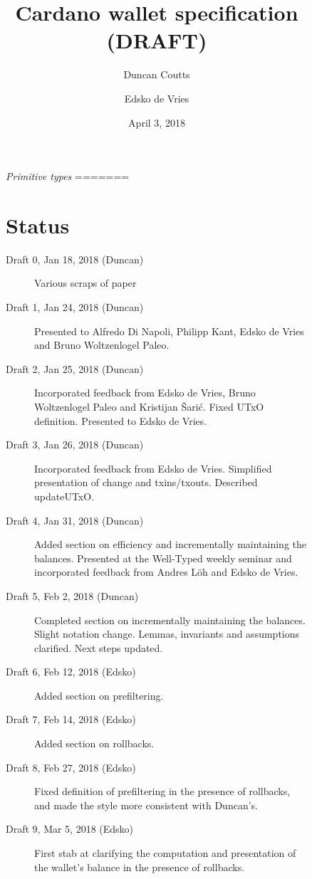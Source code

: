 \documentclass{article}
\theoremstyle{definition}{
  \newtheorem{lemma}{Lemma}[section] %
  \newtheorem{definition}[lemma]{Definition}
}
\theoremstyle{theorem}{
  \newtheorem{invariant}[lemma]{Invariant}
  \newtheorem{proofobligation}[lemma]{Proof Obligation}
}
\numberwithin{equation}{lemma}
\begin{document}
\begin{figure}

\emph{Primitive types}
=======
\title{Cardano wallet specification (DRAFT)}
\author{Duncan Coutts \and Edsko de Vries}
\date{April 3, 2018}

\maketitle

\tableofcontents
\listoffigures

\section*{Status}

\begin{description}
\item[Draft 0, Jan 18, 2018 (Duncan)] Various scraps of paper
\item[Draft 1, Jan 24, 2018 (Duncan)] Presented to Alfredo Di Napoli, Philipp Kant,
     Edsko de Vries and Bruno Woltzenlogel Paleo.
\item[Draft 2, Jan 25, 2018 (Duncan)] Incorporated feedback from Edsko de Vries,
     Bruno Woltzenlogel Paleo and Kristijan \v{S}ari\'{c}. Fixed UTxO
     definition. Presented to Edsko de Vries.
\item[Draft 3, Jan 26, 2018 (Duncan)] Incorporated feedback from Edsko de Vries.
     Simplified presentation of change and txins/txouts. Described updateUTxO.
\item[Draft 4, Jan 31, 2018 (Duncan)] Added section on efficiency and incrementally
     maintaining the balances. Presented at the Well-Typed weekly seminar and
     incorporated feedback from Andres L\"oh and Edsko de Vries.
\item[Draft 5, Feb 2, 2018 (Duncan)] Completed section on incrementally maintaining the
     balances. Slight notation change. Lemmas, invariants and assumptions
     clarified. Next steps updated.
\item[Draft 6, Feb 12, 2018 (Edsko)] Added section on prefiltering.
\item[Draft 7, Feb 14, 2018 (Edsko)] Added section on rollbacks.
\item[Draft 8, Feb 27, 2018 (Edsko)] Fixed definition of prefiltering in the presence
     of rollbacks, and made the style more consistent with Duncan's.
\item[Draft 9, Mar 5, 2018 (Edsko)] First stab at clarifying the computation and
     presentation of the wallet's balance in the presence of rollbacks.

\end{description}
\end{figure}
\end{document}
